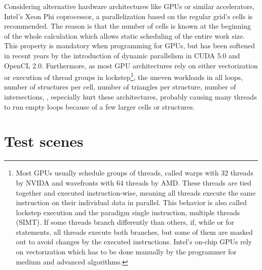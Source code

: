 Considering alternative hardware architectures like GPUs or similar accelerators, \eg Intel's Xeon Phi coprocessor, a parallelization based on the regular grid's cells is recommended.
The reason is that the number of cells is known at the beginning of the whole calculation which allows static scheduling of the entire work size.
This property is mandatory when programming for GPUs, but has been softened in recent years by the introduction of dynamic parallelism in CUDA 5.0 and OpenCL 2.0.
Furthermore, as most GPU architectures rely on either vectorization or execution of thread groups in lockstep\footnote{
	Most GPUs usually schedule groups of threads, called warps with 32 threads by NVIDA and wavefronts with 64 threads by AMD.
	These threads are tied together and executed instruction-wise, meaning all threads execute the same instruction on their individual data in parallel.
	This behavior is also called lockstep execution and the paradigm single instruction, multiple threads (SIMT).
	If some threads branch differently than others, \eg if, while or for statements, all threads execute both branches, but some of them are masked out to avoid changes by the executed instructions.
	Intel's on-chip GPUs rely on vectorization which has to be done manually by the programmer for medium and advanced algorithms.},
the uneven workloads in all loops, \eg number of structures per cell, number of triangles per structure, number of intersections, \etc, especially hurt these architectures, probably causing many threads to run empty loops because of a few larger cells or structures.


\section{Test scenes}
\label{sec:test_scenes}

